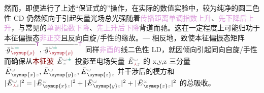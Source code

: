 
然而，即便进行了上述“保证式的”操作，在实际的数值实验中，较为纯净的\textcolor{NavyBlue}{圆二色性 CD} 仍然倾向于引起\textcolor{PineGreen}{矢量光场}\textcolor{NavyBlue}{总光强}随着\textcolor{Plum}{传播距离}\textcolor{Plum}{单调指数上升}、\textcolor{Plum}{先下降后上升}，与常见的\textcolor{Plum}{单调指数下降}、\textcolor{Plum}{先上升后下降}背道而驰。这在一定程度上可能归功于\textcolor{PineGreen}{本征偏振态}\textcolor{Plum}{非正交}且\textcolor{NavyBlue}{反向自旋}/\textcolor{NavyBlue}{手性}的缘故。--- 相反地，致使\textcolor{PineGreen}{本征偏振态矩阵} $\overline{\Xint{{}^{}_{\mathcolor{gray}{-}}}{10}{\bar{g}}^{\;\!\mathcolor{gray}{\omega} \textcolor{PineGreen}{\pm}}_{\;\! \textcolor{Maroon}{\symup{\rho}}}}^{\mathsf{\textcolor{Plum}{T}}}, \overline{\Xint{{}^{}_{\mathcolor{gray}{-}}}{10}{\bar{g}}^{\;\!\mathcolor{gray}{\omega} \textcolor{PineGreen}{\pm}}_{\;\! \textcolor{Maroon}{\symup{\rho}}}}^{-\mathsf{\textcolor{Plum}{T}}}$ 同样\textcolor{Plum}{非酉的}\textcolor{NavyBlue}{线二色性 LD}，就因倾向引起\textcolor{NavyBlue}{同向自旋}/\textcolor{NavyBlue}{手性}而确保从\textcolor{Maroon}{本征波} $\Xint{\mathcolor{gray}{-}}{25}{\bar{E}}^{\;\!\mathcolor{gray}{\omega} \textcolor{PineGreen}{\pm}}_{\;\! \mathcolor{gray}{z}}$ 投影至电场矢量 $\Xint{\mathcolor{gray}{-}}{25}{\bar{E}}^{\;\!\mathcolor{gray}{\omega}}_{\;\! \textcolor{Maroon}{\Yup} \mathcolor{gray}{z}}$ 的 x,y,z 三分量 $\Xint{\mathcolor{gray}{-}}{25}{\bar{E}}^{\;\!\mathcolor{gray}{\omega}}_{\;\! \symup{x} \mathcolor{gray}{z}}, \Xint{\mathcolor{gray}{-}}{25}{\bar{E}}^{\;\!\mathcolor{gray}{\omega}}_{\;\! \symup{y} \mathcolor{gray}{z}}, \Xint{\mathcolor{gray}{-}}{25}{\bar{E}}^{\;\!\mathcolor{gray}{\omega}}_{\;\! \symup{z} \mathcolor{gray}{z}}$ 并\textcolor{PineGreen}{干涉}后的模方和 $\lvert \Xint{\mathcolor{gray}{-}}{25}{\bar{E}}^{\;\!\mathcolor{gray}{\omega}}_{\;\! \textcolor{Maroon}{\Yup} \mathcolor{gray}{z}} \rvert^2 = \lvert \Xint{\mathcolor{gray}{-}}{25}{\bar{E}}^{\;\!\mathcolor{gray}{\omega}}_{\;\! \symup{x} \mathcolor{gray}{z}} \rvert^2 + \lvert \Xint{\mathcolor{gray}{-}}{25}{\bar{E}}^{\;\!\mathcolor{gray}{\omega}}_{\;\! \symup{y} \mathcolor{gray}{z}} \rvert^2 + \lvert \Xint{\mathcolor{gray}{-}}{25}{\bar{E}}^{\;\!\mathcolor{gray}{\omega}}_{\;\! \symup{z} \mathcolor{gray}{z}} \rvert^2$ 的总\textcolor{NavyBlue}{吸收}。

